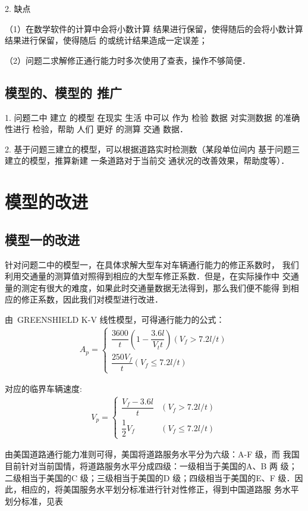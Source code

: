 2. 缺点

（1）在数学软件的计算中会将小数计算 结果进行保留，使得随后的会将小数计算 结果进行保留，使得随后
的或统计结果造成一定误差；

（2）问题二求解修正通行能力时多次使用了查表，操作不够简便．

\subsection{模型的、模型的 推广}

1. 问题二中 建立 的模型 在现实 生活 中可以 作为 检验 数据 对实测数据 的准确 性进行 检验，帮助 人们
更好 的测算 交通 数据．

2. 基于问题三建立的模型，可以根据道路实时检测数（某段单位间内 基于问题三建立的模型，推算新建
一条道路对于当前交 通状况的改善效果，帮助度等）．

\section{模型的改进}

\subsection{模型一的改进}
针对问题二中的模型一，在具体求解大型车对车辆通行能力的修正系数时，
我们利用交通量的测算值对照得到相应的大型车修正系数．但是，在实际操作中
交通量的测定有很大的难度，如果此时交通量数据无法得到，那么我们便不能得
到相应的修正系数，因此我们对模型进行改进．

由~GREENSHIELD K-V 线性模型，可得通行能力的公式：
\begin{align}
A_{p}=\begin{cases}
\dfrac{3600}{t}\left(1-\dfrac{3.6 l}{V_{t} t}\right)\left(V_{f}>7.2 l / t\right) \\
\dfrac{250 V_{f}}{t}\left(V_{f} \leq 7.2 l / t\right)
\end{cases}
\end{align}

对应的临界车辆速度:
\begin{align}
V_{p}=\begin{cases}
\dfrac{V_{f}-3.6 l}{t} & \left(V_{f}>7.2 l / t\right) \\
\dfrac{1}{2} V_{f} & \left(V_{f} \leq 7.2 l / t\right)
\end{cases}
\end{align}

由美国道路通行能力准则可得，美国将道路服务水平分为六级：A-F 级，而
我国目前针对当前国情，将道路服务水平分成四级：一级相当于美国的A、B 两
级；二级相当于美国的C 级；三级相当于美国的D 级；四级相当于美国的E、F
级．因此，相应的，将美国服务水平划分标准进行针对性修正，得到中国道路服
务水平划分标准，见表

